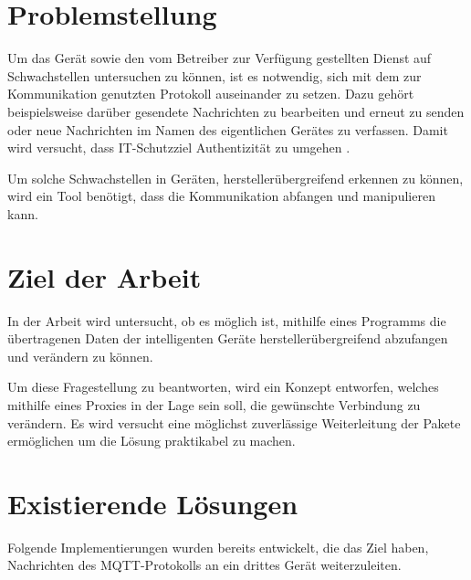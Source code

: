 \section{Problemstellung}
    Um das Gerät sowie den vom Betreiber zur Verfügung gestellten Dienst auf Schwachstellen untersuchen zu können, ist es notwendig, sich mit dem zur Kommunikation genutzten Protokoll auseinander zu setzen. Dazu gehört beispielsweise darüber gesendete Nachrichten zu bearbeiten und erneut zu senden oder neue Nachrichten im Namen des eigentlichen Gerätes zu verfassen. Damit wird versucht, dass IT-Schutzziel Authentizität zu umgehen \cite{Bedner2010}.
        
    Um solche Schwachstellen in Geräten, herstellerübergreifend erkennen zu können, wird ein Tool benötigt, dass die Kommunikation abfangen und manipulieren kann.

\section{Ziel der Arbeit}
    In der Arbeit wird untersucht, ob es möglich ist, mithilfe eines Programms die übertragenen Daten der intelligenten Geräte herstellerübergreifend abzufangen und verändern zu können.

    Um diese Fragestellung zu beantworten, wird ein Konzept entworfen, welches mithilfe eines Proxies in der Lage sein soll, die gewünschte Verbindung zu verändern. Es wird versucht eine möglichst zuverlässige Weiterleitung der Pakete ermöglichen um die Lösung praktikabel zu machen.
    
\section{Existierende Lösungen}
    Folgende Implementierungen wurden bereits entwickelt, die das Ziel haben, Nachrichten des \ac{MQTT}-Protokolls an ein drittes Gerät weiterzuleiten.
    
